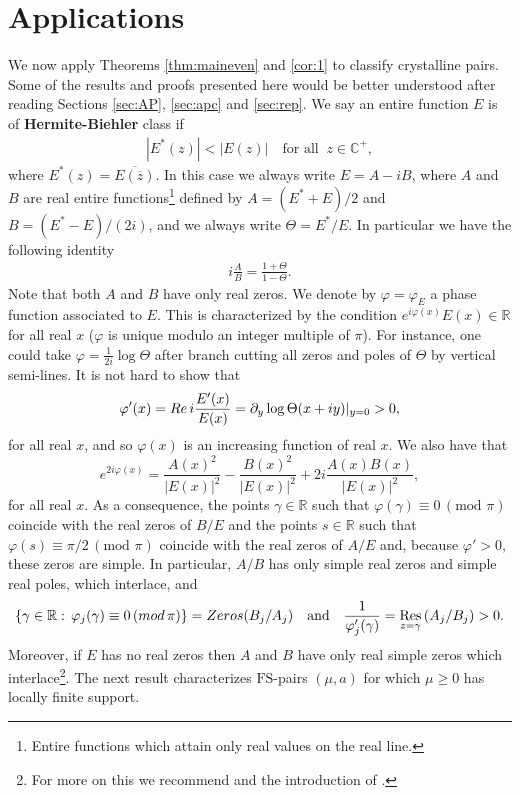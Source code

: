 \documentclass[a4paper,reqno,12pt]{amsart}
\renewcommand{\r}{\mathbb{R}}
\newcommand{\cp}{\mathbb{C}} %
\newcommand{\ga}{\gamma}
\newcommand{\p}{\varphi}
\newcommand{\1}{{\bf 1}}
\newcommand{\fs}{\mathrm{FS}}
\renewcommand{\emph}[1]{{\bf #1}}
\newcommand{\ov}[1]{\overline{#1}}
\renewcommand{\1}{{\bo 1}}
\renewcommand{\Re}{{\rm Re}\,}
\newcommand{\res}[1]{ \mathop{\mathrm{Res}}_{z = #1}\,}
\begin{document}
\section{Applications} We now apply Theorems \ref{thm:maineven} and \ref{cor:1} to classify crystalline pairs. Some of the results and proofs presented here would be better understood after reading Sections \ref{sec:AP}, \ref{sec:apc} and \ref{sec:rep}. We say an entire function $E$ is of \emph{Hermite-Biehler} class if 
\begin{align}\label{def:hermitebiehler}
|E^*(z)| < |E(z)| \quad \text{for all } \  z\in \cp^+,
\end{align}
where $E^*(z)=\ov{E(\ov z)}$. In this case we always write $E=A-iB$, where $A$ and $B$ are real entire functions\footnote{Entire functions which attain only real values on the real line.} defined by $A=(E^*+E)/2$ and $B=(E^*-E)/(2i)$, and we always write $\Theta=E^*/E$. In particular we have the following identity
\begin{align}\label{eq:AbThetaid}
i\frac{A}{B} = \frac{1+\Theta}{1-\Theta}.
\end{align}
Note that both $A$ and $B$ have only real zeros. We denote by $\varphi=\p_E$ a phase function associated to $E$. This is characterized by the condition $e^{i\varphi(x)} E(x) \in\r$ for all real $x$ ($\p$ is unique modulo an integer multiple of $\pi$). For instance, one could take $\p=\frac{1}{2i}\log \Theta$ after branch cutting all zeros and poles of $\Theta$ by vertical semi-lines. It is not hard to show that
$$
\varphi'(x)=\Re i\frac{E'(x)}{E(x)} = \partial_y \log \Theta(x+iy)|_{y=0} > 0,
$$
for all real $x$, and so $\p(x)$ is an increasing function of real $x$. We also have that
$$
e^{2i\p(x)} = \frac{A(x)^2}{|E(x)|^2}  - \frac{B(x)^2}{|E(x)|^2} + 2i\frac{A(x)B(x)}{|E(x)|^2},
$$
for all real $x$. As a consequence, the points $\ga\in\r$ such that $\p(\ga)\equiv 0 \,(\text{mod }  \pi)$ coincide with the real zeros of $B/E$ and the points $s\in\r$ such that $\p(s)\equiv \pi/2\,(\text{mod }  \pi)$ coincide with the real zeros of $A/E$ and, because $\p'>0$, these zeros are simple. In particular, $A/B$ has only simple real zeros and simple real poles, which interlace, and
 $$
\{\ga\in \r : \, \p_j(\ga)\equiv 0 \,({\rm mod} \, \pi)\} = {\rm Zeros}(B_j/A_j) \quad \text{and} \quad  \frac1{\p_j'(\ga)} = \res{\ga}(A_j/B_j)>0.
 $$
Moreover, if $E$ has no real zeros then $A$ and $B$ have only real simple zeros which interlace\footnote{For more on this we recommend \cite{dB} and the introduction of \cite{GL}.}. The next result characterizes $\fs$-pairs $(\mu,a)$ for which $\mu\geq 0$ has locally finite support.
\end{document}
